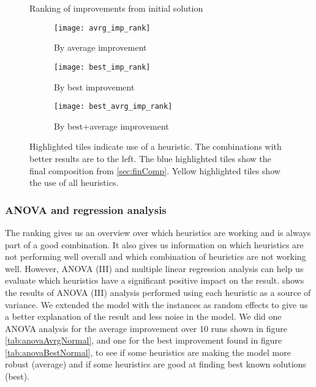 \documentclass[../main.tex]{subfiles}
\begin{document}
\begin{figure}
    \centering
    \caption{Ranking of improvements from initial solution}
    \begin{subfigure}[b]{0.95\textwidth}
        \centering
        \texttt{[image: avrg\_imp\_rank]}
        \caption{By average improvement}
        \label{fig:avrgRank}
    \end{subfigure}

    \begin{subfigure}[b]{0.95\textwidth}
        \centering
        \texttt{[image: best\_imp\_rank]}
        \caption{By best improvement}
        \label{fig:bestRank}
    \end{subfigure}

    \begin{subfigure}[b]{0.95\textwidth}
        \centering
        \texttt{[image: best\_avrg\_imp\_rank]}
        \caption{By best+average improvement}
        \label{fig:avrgBestRank}
    \end{subfigure}
    \label{fig:rank}
    \caption*{Highlighted tiles indicate use of a heuristic. The combinations with better results are to the left. The blue highlighted tiles show the final composition from \cref{sec:finComp}. Yellow highlighted tiles show the use of all heuristics.}
\end{figure}



\subsubsection{ANOVA and regression analysis}
The ranking gives us an overview over which heuristics are working and is always part of a good combination.
It also gives us information on which heuristics are not performing well overall and which combination of heuristics are not working well.
However, ANOVA (III) and multiple linear regression analysis can help us evaluate which heuristics have a significant positive impact on the result.
 shows the results of ANOVA (III) analysis performed using each heuristic as a source of variance. 
We extended the model with the instances as random effects to give us a better explanation of the result and less noise in the model. 
We did one ANOVA analysis for the average improvement over 10 runs shown in figure \ref{tab:anovaAvrgNormal}, and one for the best improvement found in figure \ref{tab:anovaBestNormal}, to see if some heuristics are making the model more robust (average) and if some heuristics are good at finding best known solutions (best). \par
\end{document}
